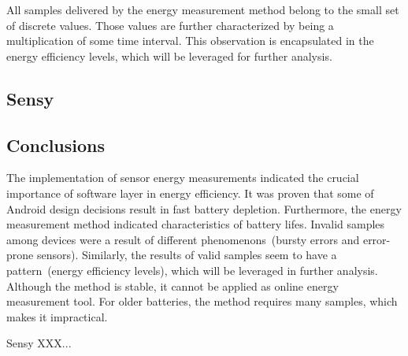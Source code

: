All samples delivered by the energy measurement method belong to the small set of discrete values. Those values are further characterized by being a multiplication of some time interval. This observation is encapsulated in the energy efficiency levels, which will be leveraged for further analysis. 

\subsection{Sensy}
\subsection{Conclusions}
The implementation of sensor energy measurements indicated the crucial importance of software layer in energy efficiency. It was proven that some of Android design decisions result in fast battery depletion. Furthermore, the energy measurement method indicated characteristics of battery lifes. Invalid samples among devices were a result of different phenomenons\ (bursty errors and error-prone sensors). Similarly, the results of valid samples seem to have a pattern\ (energy efficiency levels), which will be leveraged in further analysis. Although the method is stable, it cannot be applied as online energy measurement tool. For older batteries, the method requires many samples, which makes it impractical.

Sensy XXX...